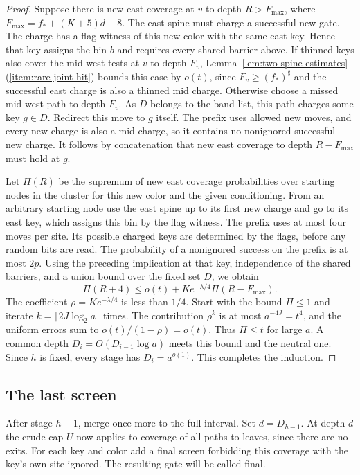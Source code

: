 \begin{proof}
Suppose there is new east coverage at \(v\) to depth \(R>F_{\max}\),
where \(F_{\max}=f_*+(K+5)d+8\). The east spine must charge a successful
new gate. The charge has a flag witness of this new color with the
same east key. Hence that key assigns the bin \(b\) and requires
every shared barrier above. If thinned keys also cover the mid west
tests at \(v\) to depth \(F_v\), Lemma~\ref{lem:two-spine-estimates}(\ref{item:rare-joint-hit}) bounds this case by \(o(t)\), since
\(F_v\ge(f_*)^\sharp\) and the successful east charge is also a
thinned mid charge. Otherwise choose a missed mid west path to depth
\(F_v\). As \(D\) belongs to the band list, this path charges some
key \(g\in D\). Redirect this move to \(g\) itself. The prefix uses
allowed new moves, and every new charge is also a mid charge, so it
contains no nonignored successful new charge. It follows by
concatenation that new east coverage to depth \(R-F_{\max}\) must
hold at \(g\).

Let \(\Pi(R)\) be the supremum of new east coverage probabilities
over starting nodes in the cluster for this new color and the given
conditioning. From an arbitrary starting node use the east spine
up to its first new charge and go to its east key, which assigns
this bin by the flag witness. The prefix uses at most four moves per site. Its possible charged
keys are determined by the flags, before any random bits are read.
The probability of a nonignored success on the prefix is at most
\(2p\). Using the preceding implication at
that key, independence of the shared barriers, and a union bound
over the fixed set \(D\), we obtain
\[
 \Pi(R+4)\le o(t)+K e^{-\lambda/4}\Pi(R-F_{\max}).
\]
The coefficient \(\rho=K e^{-\lambda/4}\) is less than \(1/4\).
Start with the bound \(\Pi\le1\) and iterate
\(k=\lceil2J\log_2 a\rceil\) times. The contribution \(\rho^k\)
is at most \(a^{-4J}=t^4\), and the uniform errors sum to
\(o(t)/(1-\rho)=o(t)\). Thus \(\Pi\le t\) for large \(a\). A common depth \(D_i=O(D_{i-1}\log a)\) meets this
bound and the neutral one. Since \(h\) is fixed, every stage has
\(D_i=a^{o(1)}\). This completes the induction.
\end{proof}

\subsection{The last screen}

After stage \(h-1\), merge once more to the full interval. Set
\(d=D_{h-1}\). At depth \(d\) the crude cap \(U\) now applies to
coverage of all paths to leaves, since there are no exits. For each
key and color add a final screen forbidding this coverage with the
key's own site ignored. The resulting gate will be called final.

